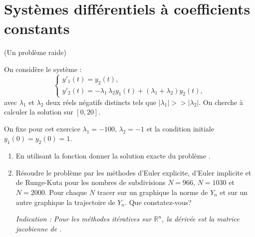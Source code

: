 \documentclass[a4paper,12pt,reqno]{amsart}
\begin{document}
\section{Systèmes différentiels à coefficients constants}


\begin{exo} (Un problème raide)

On considère le système :
  $$
    \begin{cases}
      y'_1(t) = y_2(t),\\
      y'_2(t) = -\lambda_1 \, \lambda_2 y_1(t)+(\lambda_1+\lambda_2) y_2(t),
    \end{cases}
  $$
avec $\lambda_1$ et $\lambda_2$ deux réels négatifs distincts tels que $|\lambda_1| >> |\lambda_2|$. On  cherche à calculer la solution sur $[0,20]$.

On fixe pour cet exercice $\lambda_1=-100$, $\lambda_2=-1$ et la condition initiale $y_{1}(0)=y_{2}(0)=1$.
\begin{enumerate}
  \item En utilisant la fonction  donner la solution exacte du problème .
  \item Résoudre le problème par les méthodes d'Euler explicite, d'Euler implicite et de Runge-Kuta pour les nombres de subdivisions $N = 966$, $N = 1030$ et $N = 2000$. Pour chaque $N$ tracer sur un graphique la norme de $Y_{n}$ et sur un autre graphique la trajectoire de $Y_{n}$.
  Que constatez-vous?

  \textit{Indication : Pour les méthodes itératives sur $\mathbb{R}^{n}$, la \og{}dérivée\fg{}  est la matrice jacobienne de .}
\end{enumerate}
\end{exo}
\end{document}
